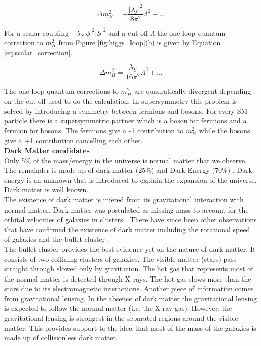 \begin{equation}
\Delta m_{H}^{2} = -\frac{|\lambda_{f}|^{2}}{8\pi^{2}}\Lambda^{2} + ...
\label{eq:fermion_correction}
\end{equation}

For a scalar coupling $-\lambda_{S}|\phi|^{2}|S|^{2}$ and a cut-off $\Lambda$ 
the one-loop quantum correction to $m_{H}^{2}$ from Figure 
\ref{fig:higgs_loop}(b) is given by Equation \ref{eq:scalar_correction}.

\begin{equation}
\Delta m_{H}^{2} = \frac{\lambda_{S}}{16\pi^{2}}\Lambda^{2} + ...
\label{eq:scalar_correction}
\end{equation}

The one-loop quantum corrections to $m_{H}^{2}$ are quadratically divergent
depending on the cut-off used to do the calculation. In supersymmetry this
problem is solved by introducing a symmetry between fermions and bosons. For 
every SM particle there is a supersymmetric partner which is a boson 
for fermions and a fermion for bosons. The fermions give a -1 contribution to 
$m_{H}^{2}$ while the bosons give a +1 contribution cancelling each other. \\

{\bf Dark Matter candidates} \\

Only 5\% of the mass/energy in the universe is normal matter that we observe. 
The remainder is made up of dark matter (25\%) and Dark Energy (70\%) 
\cite{wmap}. Dark energy is an unknown that is introduced to explain the 
expansion of the universe. Dark matter is well known. \\

The existence of dark matter is infered from its gravitational interaction with
normal matter. Dark matter was postulated as missing mass to account for the 
orbital velocities of galaxies in clusters \cite{zwicky}. There have since been 
other observations that have confirmed the existence of dark matter including the 
rotational speed of galaxies \cite{rotation} and the bullet cluster \cite{bullet}. \\

The bullet cluster provides the best evidence yet on the nature of dark matter. 
It consists of two colliding clusters of galaxies. The visible matter (stars) 
pass straight through slowed only by gravitation. The hot gas that represents 
most of the normal matter is detected through X-rays. The hot gas slows more 
than the stars due to its electromagnetic interactions. Another piece of
information comes from gravitational lensing. In the absence of dark matter the
gravitational lensing is expected to follow the normal matter (i.e. the X-ray 
gas). However, the gravitational lensing is strongest in the separated regions
around the visible matter. This provides support to the idea that most of the 
mass of the galaxies is made up of collisionless dark matter. \\

